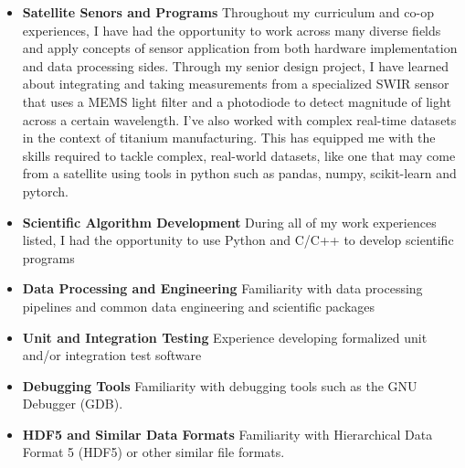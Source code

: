 \begin{itemize}
    \item \textbf{Satellite Senors and Programs} Throughout my 
    curriculum and co-op experiences, I have had the opportunity 
    to work across many diverse fields and apply concepts of sensor 
    application from both hardware implementation and data 
    processing sides. Through my senior design project, I have 
    learned about integrating and taking measurements from 
    a specialized SWIR sensor that uses a MEMS light filter and 
    a photodiode to detect magnitude of light across a certain 
    wavelength. I've also worked with complex real-time datasets
    in the context of titanium manufacturing. This has equipped
    me with the skills required to tackle complex, real-world
    datasets, like one that may come from a satellite using tools 
    in python such as pandas, numpy, scikit-learn and pytorch.
    
    \item \textbf{Scientific Algorithm Development} During all of
    my work experiences listed, I had the opportunity to use Python 
    and C/C++ to develop scientific programs 
    
    \item \textbf{Data Processing and Engineering} Familiarity with data processing pipelines and common data engineering and scientific packages
    
    \item \textbf{Unit and Integration Testing} Experience developing formalized unit and/or integration test software
    
    \item \textbf{Debugging Tools} Familiarity with debugging tools such as the GNU Debugger (GDB).
    
    \item \textbf{HDF5 and Similar Data Formats} Familiarity with Hierarchical Data Format 5 (HDF5) or other similar file formats.
\end{itemize}